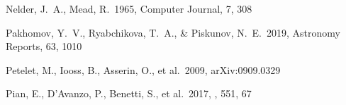 \documentclass[twocolumn, twocolappendix]{aastex63}
\begin{document}
\begin{itemize}
\begin{thebibliography}{}












 Nelder, J.~A., Mead, R.\ 1965, Computer Journal, 7, 308





 Pakhomov, Y.~V., Ryabchikova, T.~A., \& Piskunov, N.~E.\ 2019, Astronomy Reports, 63, 1010








 Petelet, M., Iooss, B., Asserin, O., et al.\ 2009, arXiv:0909.0329


 Pian, E., D'Avanzo, P., Benetti, S., et al.\ 2017, \nat, 551, 67





\end{thebibliography}
\end{itemize}
\end{document}
